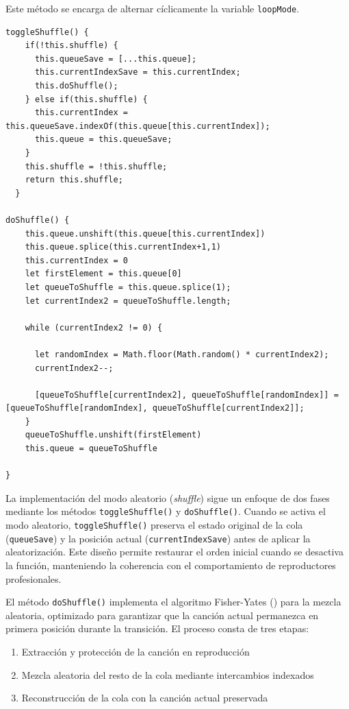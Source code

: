 \documentclass[11pt, a4paper]{article}
\begin{document}
                Este método se encarga de alternar cíclicamente la variable \texttt{loopMode}.

                \begin{lstlisting}[caption={Shuffle}]
toggleShuffle() {
    if(!this.shuffle) {
      this.queueSave = [...this.queue];
      this.currentIndexSave = this.currentIndex;
      this.doShuffle();
    } else if(this.shuffle) {
      this.currentIndex = this.queueSave.indexOf(this.queue[this.currentIndex]);
      this.queue = this.queueSave;
    }
    this.shuffle = !this.shuffle;
    return this.shuffle;
  }

doShuffle() {
    this.queue.unshift(this.queue[this.currentIndex])
    this.queue.splice(this.currentIndex+1,1)
    this.currentIndex = 0
    let firstElement = this.queue[0]
    let queueToShuffle = this.queue.splice(1);
    let currentIndex2 = queueToShuffle.length;

    while (currentIndex2 != 0) {

      let randomIndex = Math.floor(Math.random() * currentIndex2);
      currentIndex2--;

      [queueToShuffle[currentIndex2], queueToShuffle[randomIndex]] = [queueToShuffle[randomIndex], queueToShuffle[currentIndex2]];
    }
    queueToShuffle.unshift(firstElement)
    this.queue = queueToShuffle
    
}
                \end{lstlisting}

                La implementación del modo aleatorio (\textit{shuffle}) sigue un enfoque de dos fases mediante los métodos \texttt{toggleShuffle()} y \texttt{doShuffle()}. Cuando se activa el modo aleatorio, \texttt{toggleShuffle()} preserva el estado original de la cola (\texttt{queueSave}) y la posición actual (\texttt{currentIndexSave}) antes de aplicar la aleatorización. Este diseño permite restaurar el orden inicial cuando se desactiva la función, manteniendo la coherencia con el comportamiento de reproductores profesionales.

                El método \texttt{doShuffle()} implementa el algoritmo Fisher-Yates (\textcite{wikifisheryates}) para la mezcla aleatoria, optimizado para garantizar que la canción actual permanezca en primera posición durante la transición. El proceso consta de tres etapas:
                \begin{enumerate}
                    \item Extracción y protección de la canción en reproducción
                    \item Mezcla aleatoria del resto de la cola mediante intercambios indexados
                    \item Reconstrucción de la cola con la canción actual preservada
                \end{enumerate}
                
\end{document}
